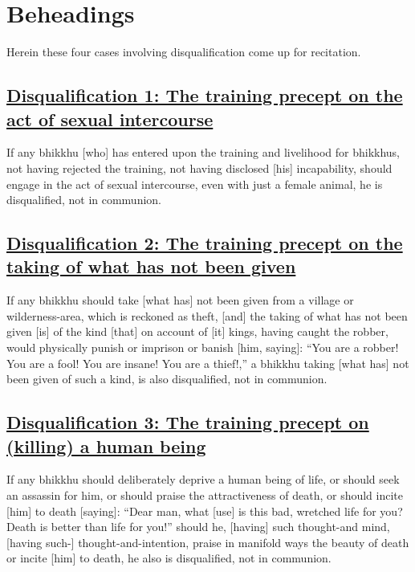 \section{Beheadings}
\label{beheadings}

\begin{intro}
  Herein these four cases involving disqualification come up for recitation.
\end{intro}

\setsubsecheadstyle{\subsubsectionFmt}
\subsection*{\hyperref[par1]{Disqualification 1: The training precept on the act of sexual intercourse}}
\label{disq1}
If any bhikkhu [who] has entered upon the training and livelihood for bhikkhus, not having rejected the training, not having disclosed [his] incapability, should engage in the act of sexual intercourse, even with just a female animal, he is disqualified, not in communion.

\subsection*{\hyperref[par2]{Disqualification 2: The training precept on the taking of what has not been given}}
\label{disq2}
If any bhikkhu should take [what has] not been given from a village or wilderness-area, which is reckoned as theft, [and] the taking of what has not been given [is] of the kind [that] on account of [it] kings, having caught the robber, would physically punish or imprison or banish [him, saying]: ``You are a robber! You are a fool! You are insane! You are a thief!,'' a bhikkhu taking [what has] not been given of such a kind, is also disqualified, not in communion.

\subsection*{\hyperref[par3]{Disqualification 3: The training precept on (killing) a human being}}
\label{disq3}
If any bhikkhu should deliberately deprive a human being of life, or should seek an assassin for him, or should praise the attractiveness of death, or should incite [him] to death [saying]: ``Dear man, what [use] is this bad, wretched life for you? Death is better than life for you!'' should he, [having] such thought-and mind, [having such-] thought-and-intention, praise in manifold ways the beauty of death or incite [him] to death, he also is disqualified, not in communion.

